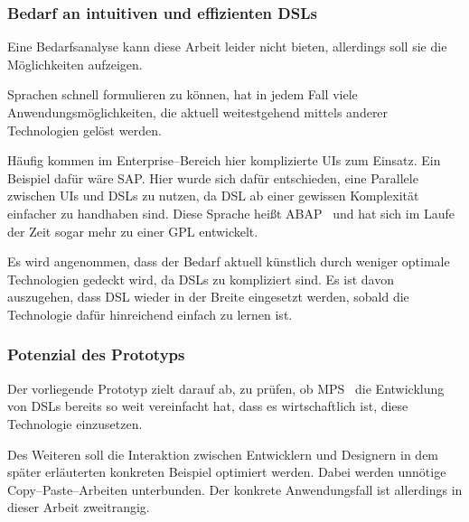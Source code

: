 \subsubsection{Bedarf an intuitiven und effizienten \aclp{DSL}}
Eine Bedarfsanalyse kann diese Arbeit leider nicht bieten, allerdings soll sie die Möglichkeiten aufzeigen.

Sprachen schnell formulieren zu können, hat in jedem Fall viele Anwendungsmöglichkeiten, die aktuell weitestgehend mittels anderer Technologien gelöst werden.

Häufig kommen im Enterprise--Bereich hier komplizierte \acp{UI} zum Einsatz.
Ein Beispiel dafür wäre SAP\@.
Hier wurde sich dafür entschieden, eine Parallele zwischen \acp{UI} und \acp{DSL} zu nutzen, da \ac{DSL} ab einer gewissen Komplexität einfacher zu handhaben sind.
Diese Sprache heißt ABAP~\autocite{sap-se-no-date} und hat sich im Laufe der Zeit sogar mehr zu einer \ac{GPL} entwickelt.

Es wird angenommen, dass der Bedarf aktuell künstlich durch weniger optimale Technologien gedeckt wird, da \acp{DSL} zu kompliziert sind.
Es ist davon auszugehen, dass \ac{DSL} wieder in der Breite eingesetzt werden, sobald die Technologie dafür hinreichend einfach zu lernen ist.

\subsubsection{Potenzial des Prototyps}
Der vorliegende Prototyp zielt darauf ab, zu prüfen, ob \ac{MPS}~\autocite{jetbrains-sro-2021} die Entwicklung von \acp{DSL} bereits so weit vereinfacht hat, dass es wirtschaftlich ist, diese Technologie einzusetzen.

Des Weiteren soll die Interaktion zwischen Entwicklern und Designern in dem später erläuterten konkreten Beispiel optimiert werden.
Dabei werden unnötige Copy--Paste--Arbeiten unterbunden.
Der konkrete Anwendungsfall ist allerdings in dieser Arbeit zweitrangig.

